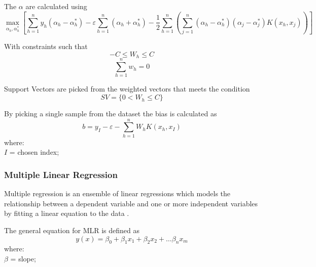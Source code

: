 The $\alpha$ are calculated using
\begin{equation}
	\max_{\alpha_h, \alpha_h^*} \left[ \sum_{h=1}^n y_h (\alpha_h - \alpha_h^*) - \varepsilon \sum_{h=1}^n (\alpha_h + \alpha_h^*) - \frac{1}{2} \sum_{h=1}^n \left( \sum_{j=1}^n (\alpha_h - \alpha_h^*) (\alpha_j - \alpha_j^*) K(x_h, x_j) \right) \right]
	\label{eq:alpha_calculation}
\end{equation}

With constraints such that
\begin{equation}
	-C \leq W_h \leq C
	\label{eq:weight_constraint_1}
\end{equation}
\begin{equation}
	\sum_{h=1}^n w_h = 0
	\label{eq:weight_constraint_2}
\end{equation}

Support Vectors are picked from the weighted vectors that meets the condition
\begin{equation}
	SV = \{0 < W_h \leq C\}
	\label{eq:support_vectors}
\end{equation}

By picking a single sample from the dataset the bias is calculated as
\begin{equation}
	b = y_I - \varepsilon - \sum_{h=1}^n W_h K(x_h, x_I)
	\label{eq:bias_calculation}
\end{equation}
\noindent where: \\[2pt]
$I$ = chosen index; \\[12pt]


\subsubsection{Multiple Linear Regression} 
Multiple regression is an ensemble of linear regressions which models the relationship between a dependent variable and one or more independent variables by fitting a linear equation to the data \cite{Hastie_2009}. 

The general equation for MLR is defined as
\begin{equation}
	y(x) = \beta_0 + \beta_1 x_1 + \beta_2 x_2 + \dots \beta_n x_m
	\label{eq:mlr_equation}
\end{equation}
\noindent where: \\[2pt]
$\beta$ = slope; \\[12pt]

